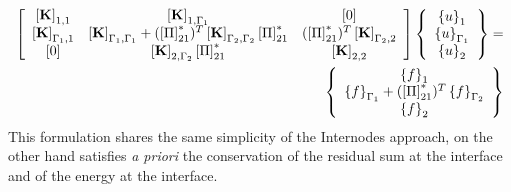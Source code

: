 \begin{equation}
\label{eq.79}
\begin{aligned}
\left[ \begin{array}{ccc} 
    \left[{\mathbf{K}}\right]_{1,1} & \left[{\mathbf{K}}\right]_{1,\Gamma_1} & \left[{0}\right] \\
   \left[{\mathbf{K}}\right]_{\Gamma_1,1} & \left[{\mathbf{K}}\right]_{\Gamma_1,\Gamma_1}+ (\left[{\Pi}\right]_{21}^{*})^T\left[{\mathbf{K}}\right]_{\Gamma_2,\Gamma_2}\left[{\Pi}\right]_{21}^* & (\left[{\Pi}\right]_{21}^{*})^T\left[{\mathbf{K}}\right]_{\Gamma_2,2}\\   
    \left[{0}\right] & \left[{\mathbf{K}}\right]_{2,\Gamma_2}\left[{\Pi}\right]^{*}_{21} & \left[{\mathbf{K}}\right]_{2,2}\end{array} \right] \left\lbrace \begin{array}{c} \left\lbrace{u}\right \rbrace_1\\\left\lbrace{u}\right \rbrace_{\Gamma_1}\\\left\lbrace{u}\right \rbrace_2
    \end{array}\right\rbrace=\\ \left\lbrace\begin{array}{c} \left\lbrace{f}\right \rbrace_1\\\left\lbrace{f}\right \rbrace_{\Gamma_1}+(\left[{\Pi}\right]_{21}^{*})^T\left\lbrace{f}\right \rbrace_{\Gamma_2}\\\left\lbrace{f}\right \rbrace_2
    \end{array}\right\rbrace
\end{aligned}
\end{equation}
This formulation shares the same simplicity of the Internodes approach, on the other hand satisfies \textit{\textit{a priori}} the conservation of the residual sum at the interface and of the energy at the interface.  

